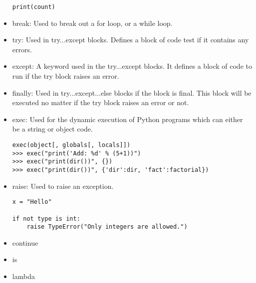 \documentclass[a4paper, 12pt]{article}
\begin{document}
\begin{itemize}
\begin{tcolorbox}
\begin{lstlisting}
print(count)
\end{lstlisting}
\end{tcolorbox}
\item{break: Used to break out a for loop, or a while loop.}
\item{try: Used in try...except blocks. Defines a block of code test if it contains any errors.}
\item{except: A keyword used in the try...except blocks. It defines a block of code to run if the try block raises an error.}
\item{finally: Used in try...except...else blocks if the block is final. This block will be executed no matter if the try block raises an error or not.}
\item{exec: Used for the dynamic execution of Python programs which can either be a string or object code.}
\begin{tcolorbox}
\begin{lstlisting}
exec(object[, globals[, locals]])
>>> exec("print('Add: %d' % (5+1))")
>>> exec("print(dir())", {})
>>> exec("print(dir())", {'dir':dir, 'fact':factorial})
\end{lstlisting}
\end{tcolorbox}
\item{raise: Used to raise an exception.}
\begin{tcolorbox}
\begin{lstlisting}
x = "Hello"

if not type is int:
	raise TypeError("Only integers are allowed.")
\end{lstlisting}
\end{tcolorbox}
\item{continue}
\item{is}
\item{lambda}
\end{itemize}
\end{document}
